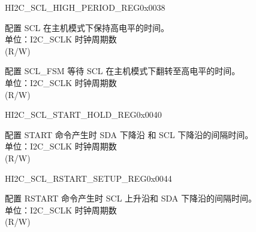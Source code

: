    \begin{register}{H}{I2C\_SCL\_HIGH\_PERIOD\_REG}{0x0038}\label{regdesc:I2CSCLHIGHPERIODREG}
    \regnewline%
    \begin{regdesc}\begin{reglist}
    \label{fielddesc:I2CSCLHIGHPERIOD}\item [I2C\_SCL\_HIGH\_PERIOD] 配置 SCL 在主机模式下保持高电平的时间。\\
    单位：I2C\_SCLK 时钟周期数 \\ (R/W)
    \label{fielddesc:I2CSCLWAITHIGHPERIOD}\item [I2C\_SCL\_WAIT\_HIGH\_PERIOD] 配置 SCL\_FSM 等待 SCL 在主机模式下翻转至高电平的时间。\\
    单位：I2C\_SCLK 时钟周期数 \\ (R/W)
    \end{reglist}\end{regdesc}
    \end{register}


    \begin{register}{H}{I2C\_SCL\_START\_HOLD\_REG}{0x0040}\label{regdesc:I2CSCLSTARTHOLDREG}
    \regnewline%
    \begin{regdesc}\begin{reglist}
    \label{fielddesc:I2CSCLSTARTHOLDTIME}\item [I2C\_SCL\_START\_HOLD\_TIME] 配置 START 命令产生时 SDA 下降沿 和 SCL 下降沿的间隔时间。\\
    单位：I2C\_SCLK 时钟周期数 \\ (R/W)
    \end{reglist}\end{regdesc}
    \end{register}


    \begin{register}{H}{I2C\_SCL\_RSTART\_SETUP\_REG}{0x0044}\label{regdesc:I2CSCLRSTARTSETUPREG}
    \regnewline%
    \begin{regdesc}\begin{reglist}
    \label{fielddesc:I2CSCLRSTARTSETUPTIME}\item [I2C\_SCL\_RSTART\_SETUP\_TIME] 配置 RSTART 命令产生时 SCL 上升沿和 SDA 下降沿的间隔时间。\\
    单位：I2C\_SCLK 时钟周期数 \\ (R/W)
    \end{reglist}\end{regdesc}
    \end{register}


